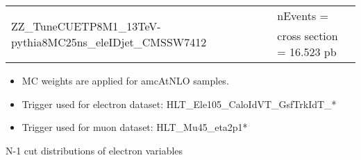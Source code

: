 \documentclass[aspectratio=169]{beamer}
\begin{document}
\begin{frame}
\begin{tiny}
\begin{center}
\begin{tabular}{ | l | l | }
        \hline
        \multirow{2}{*}{ZZ\_TuneCUETP8M1\_13TeV-pythia8MC25ns\_eleIDjet\_CMSSW7412} & nEvents =  \\
        & cross section = 16.523 pb \\
        \hline
      \end{tabular}
      \newline \newline
      \begin{itemize}
      \item[\checkmark] MC weights are applied for amcAtNLO samples.
      \item[\checkmark] Trigger used for electron dataset: HLT\_Ele105\_CaloIdVT\_GsfTrkIdT\_*
      \item[\checkmark] Trigger used for muon dataset: HLT\_Mu45\_eta2p1*
      \end{itemize}
    \end{center}
  \end{tiny}
\end{frame}

\begin{frame}
  \LARGE{\centerline{N-1 cut distributions of electron variables}}
\end{frame}
\end{document}
